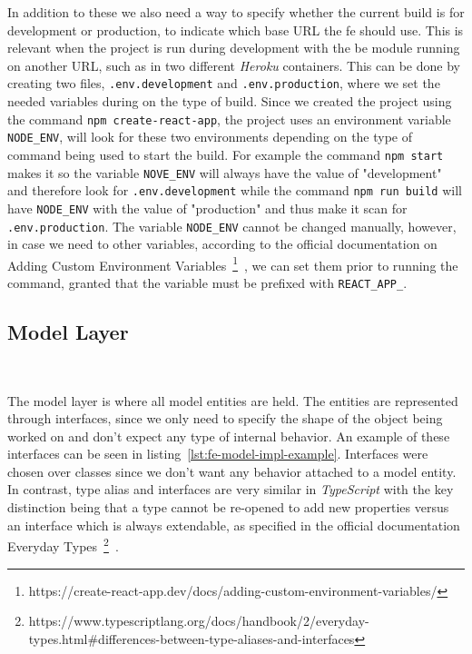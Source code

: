 In addition to these we also need a way to specify whether the current build is for development or production, to indicate which base URL the \acrshort{fe} should use. This is relevant when the project is run during development with the \acrshort{be} module running on another URL, such as in two different \textit{Heroku} containers.
This can be done by creating two files, \lstinline{.env.development} and \lstinline{.env.production}, where we set the needed variables during on the type of build. Since we created the project using the command \lstinline{npm create-react-app}, the project uses an environment variable \lstinline{NODE_ENV}, will look for these two environments depending on the type of command being used to start the build. For example the command \lstinline{npm start} makes it so the variable \lstinline{NOVE_ENV} will always have the value of "development" and therefore look for \lstinline{.env.development} while the command \lstinline{npm run build} will have \lstinline{NODE_ENV} with the value of "production" and thus make it scan for \lstinline{.env.production}. The variable \lstinline{NODE_ENV} cannot be changed manually, however, in case we need to other variables, according to the official documentation on Adding Custom Environment Variables~\footnote{https://create-react-app.dev/docs/adding-custom-environment-variables/}~\label{fn:cra-add-custom-env}, we can set them prior to running the command, granted that the variable must be prefixed with \lstinline{REACT_APP_}.


\subsection{Model Layer}~\label{ch:impl:sec:fe:subsec:model-layer}

The model layer is where all model entities are held. 
The entities are represented through interfaces, since we only need to specify the shape of the object being worked on and don't expect any type of internal behavior. An example of these interfaces can be seen in listing~\ref{lst:fe-model-impl-example}.
Interfaces were chosen over classes since we don't want any behavior attached to a model entity. In contrast, type alias and interfaces are very similar in \textit{TypeScript} with the key distinction being that a type cannot be re-opened to add new properties versus an interface which is always extendable, as specified in the official documentation Everyday Types~\footnote{https://www.typescriptlang.org/docs/handbook/2/everyday-types.html\#differences-between-type-aliases-and-interfaces}~\label{fn:ts-type-vs-interface}.

